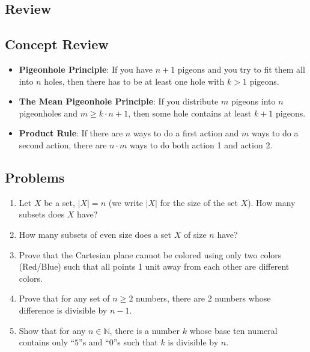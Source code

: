 \subsection{Review}
\begin{mdframed}[linewidth=1]
\section*{Concept Review}
\begin{itemize}
    \item \textbf{Pigeonhole Principle}: If you have $n + 1$ pigeons and you try to fit them all into $n$ holes, then there has to be at least one hole with $k > 1$ pigeons. 

    \item \textbf{The Mean Pigeonhole Principle}: If you distribute $m$ pigeons into $n$ pigeonholes and $m\geq k\cdot n +1$, then some hole contains at least $k+1$ pigeons. 

    \item \textbf{Product Rule}: If there are $n$ ways to do a first action and $m$ ways to do a second action, there are $n\cdot m$ ways to do both action 1 and action 2. 
\end{itemize}
\end{mdframed}


\newpage
\begin{mdframed}[linewidth=1]
\section*{Problems}
\begin{enumerate}
    \item Let $X$ be a set, $|X| = n$ (we write $|X|$ for the size of the set $X$). How many subsets does $X$ have? 

    \item How many subsets of even size does a set $X$ of size $n$ have?

    \item Prove that the Cartesian plane cannot be colored using only two colors (Red/Blue) such that all points 1 unit away from each other are different colors. 

    \item Prove that for any set of $n \geq 2$ numbers, there are $2$ numbers whose difference is divisible by $n - 1$. 

    \item Show that for any $n \in \mathbb{N}$, there is a number $k$ whose base ten numeral contains only ``$5$''s and ``$0$''s such that $k$ is divisible by $n$.  
\end{enumerate}
\end{mdframed}

